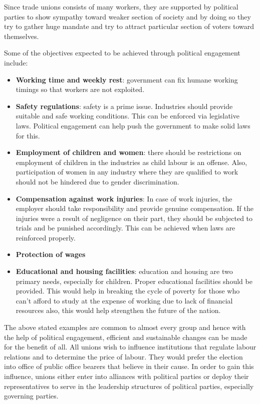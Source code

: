 Since trade unions consists of many workers, they are supported by
political parties to show sympathy toward weaker section of society and
by doing so they try to gather huge mandate and try to attract
particular section of voters toward themselves.

Some of the objectives expected to be achieved through political
engagement include:

\begin{itemize}
\item
  \textbf{Working time and weekly rest}: government can fix humane
  working timings so that workers are not exploited.
\item
  \textbf{Safety regulations}: safety is a prime issue. Industries
  should provide suitable and safe working conditions. This can be
  enforced via legislative laws. Political engagement can help push the
  government to make solid laws for this.
\item
  \textbf{Employment of children and women}: there should be
  restrictions on employment of children in the industries as child
  labour is an offense. Also, participation of women in any industry
  where they are qualified to work should not be hindered due to gender
  discrimination.
\item
  \textbf{Compensation against work injuries}: In case of work injuries,
  the employer should take responsibility and provide genuine
  compensation. If the injuries were a result of negligence on their
  part, they should be subjected to trials and be punished accordingly.
  This can be achieved when laws are reinforced properly.
\item
  \textbf{Protection of wages}
\item
  \textbf{Educational and housing facilities}: education and housing are
  two primary needs, especially for children. Proper educational
  facilities should be provided. This would help in breaking the cycle
  of poverty for those who can't afford to study at the expense of
  working due to lack of financial resources also, this would help
  strengthen the future of the nation.
\end{itemize}

The above stated examples are common to almost every group and hence
with the help of political engagement, efficient and sustainable changes
can be made for the benefit of all. All unions wish to influence
institutions that regulate labour relations and to determine the price
of labour. They would prefer the election into office of public office
bearers that believe in their cause. In order to gain this influence,
unions either enter into alliances with political parties or deploy
their representatives to serve in the leadership structures of political
parties, especially governing parties.

